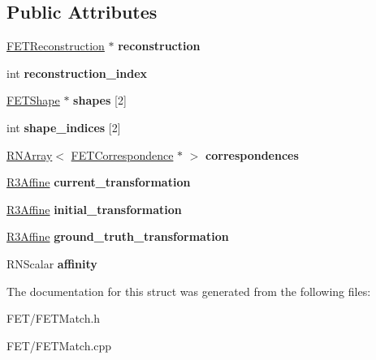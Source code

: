 \subsection*{Public Attributes}
\begin{DoxyCompactItemize}
\item 
\hyperlink{struct_f_e_t_reconstruction}{F\+E\+T\+Reconstruction} $\ast$ {\bfseries reconstruction}\hypertarget{struct_f_e_t_match_a1dc9c27fad9881f8d28fd0e59ab66ffa}{}\label{struct_f_e_t_match_a1dc9c27fad9881f8d28fd0e59ab66ffa}

\item 
int {\bfseries reconstruction\+\_\+index}\hypertarget{struct_f_e_t_match_a0d86c1aa5853cda192309ab299f2d423}{}\label{struct_f_e_t_match_a0d86c1aa5853cda192309ab299f2d423}

\item 
\hyperlink{struct_f_e_t_shape}{F\+E\+T\+Shape} $\ast$ {\bfseries shapes} \mbox{[}2\mbox{]}\hypertarget{struct_f_e_t_match_a163d1ef35099a5e73fa88057bee205e6}{}\label{struct_f_e_t_match_a163d1ef35099a5e73fa88057bee205e6}

\item 
int {\bfseries shape\+\_\+indices} \mbox{[}2\mbox{]}\hypertarget{struct_f_e_t_match_ae596c6ae0b1eea44b1d0adc8b1eb1c92}{}\label{struct_f_e_t_match_ae596c6ae0b1eea44b1d0adc8b1eb1c92}

\item 
\hyperlink{class_r_n_array}{R\+N\+Array}$<$ \hyperlink{struct_f_e_t_correspondence}{F\+E\+T\+Correspondence} $\ast$ $>$ {\bfseries correspondences}\hypertarget{struct_f_e_t_match_ac8065d3ce7e09d233000d50559ec00d0}{}\label{struct_f_e_t_match_ac8065d3ce7e09d233000d50559ec00d0}

\item 
\hyperlink{class_r3_affine}{R3\+Affine} {\bfseries current\+\_\+transformation}\hypertarget{struct_f_e_t_match_a2f43c227c7003d70fc464a2c41cb4faa}{}\label{struct_f_e_t_match_a2f43c227c7003d70fc464a2c41cb4faa}

\item 
\hyperlink{class_r3_affine}{R3\+Affine} {\bfseries initial\+\_\+transformation}\hypertarget{struct_f_e_t_match_afe052346e81dc44470600141242e35ab}{}\label{struct_f_e_t_match_afe052346e81dc44470600141242e35ab}

\item 
\hyperlink{class_r3_affine}{R3\+Affine} {\bfseries ground\+\_\+truth\+\_\+transformation}\hypertarget{struct_f_e_t_match_af86f8b689ef00124f6f3f4afc8073591}{}\label{struct_f_e_t_match_af86f8b689ef00124f6f3f4afc8073591}

\item 
R\+N\+Scalar {\bfseries affinity}\hypertarget{struct_f_e_t_match_a2c6ae3941610c6ded128f478040994e8}{}\label{struct_f_e_t_match_a2c6ae3941610c6ded128f478040994e8}

\end{DoxyCompactItemize}


The documentation for this struct was generated from the following files\+:\begin{DoxyCompactItemize}
\item 
F\+E\+T/F\+E\+T\+Match.\+h\item 
F\+E\+T/F\+E\+T\+Match.\+cpp\end{DoxyCompactItemize}
